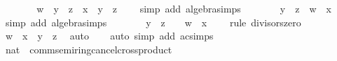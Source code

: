 \begin{isabellebody}
\ \ \ \ \isamarkupfalse%
\ \isamarkupfalse%
\ {\isachardoublequoteopen}w\ {\isacharasterisk}{\kern0pt}\ {\isacharparenleft}{\kern0pt}y\ {\isacharminus}{\kern0pt}\ z{\isacharparenright}{\kern0pt}\ {\isacharminus}{\kern0pt}\ x\ {\isacharasterisk}{\kern0pt}\ {\isacharparenleft}{\kern0pt}y\ {\isacharminus}{\kern0pt}\ z{\isacharparenright}{\kern0pt}\ {\isacharequal}{\kern0pt}\ {}{\isachardoublequoteclose}\ \isamarkupfalse%
\ {\isacharparenleft}{\kern0pt}simp\ add{\isacharcolon}{\kern0pt}\ algebra{\isacharunderscore}{\kern0pt}simps{\isacharparenright}{\kern0pt}\isanewline
\ \ \ \ \isamarkupfalse%
\ \isamarkupfalse%
\ {\isachardoublequoteopen}{\isacharparenleft}{\kern0pt}y\ {\isacharminus}{\kern0pt}\ z{\isacharparenright}{\kern0pt}\ {\isacharasterisk}{\kern0pt}\ {\isacharparenleft}{\kern0pt}w\ {\isacharminus}{\kern0pt}\ x{\isacharparenright}{\kern0pt}\ {\isacharequal}{\kern0pt}\ {}{\isachardoublequoteclose}\ \isamarkupfalse%
\ {\isacharparenleft}{\kern0pt}simp\ add{\isacharcolon}{\kern0pt}\ algebra{\isacharunderscore}{\kern0pt}simps{\isacharparenright}{\kern0pt}\isanewline
\ \ \ \ \isamarkupfalse%
\ \isamarkupfalse%
\ {\isachardoublequoteopen}y\ {\isacharminus}{\kern0pt}\ z\ {\isacharequal}{\kern0pt}\ {}\ {\isasymor}\ w\ {\isacharminus}{\kern0pt}\ x\ {\isacharequal}{\kern0pt}\ {}{\isachardoublequoteclose}\ \isamarkupfalse%
\ {\isacharparenleft}{\kern0pt}rule\ divisors{\isacharunderscore}{\kern0pt}zero{\isacharparenright}{\kern0pt}\isanewline
\ \ \ \ \isamarkupfalse%
\ \isamarkupfalse%
\ {\isachardoublequoteopen}w\ {\isacharequal}{\kern0pt}\ x\ {\isasymor}\ y\ {\isacharequal}{\kern0pt}\ z{\isachardoublequoteclose}\ \isamarkupfalse%
\ auto\isanewline
\ \ \isamarkupfalse%
\ {\isacharparenleft}{\kern0pt}auto\ simp\ add{\isacharcolon}{\kern0pt}\ ac{\isacharunderscore}{\kern0pt}simps{\isacharparenright}{\kern0pt}\isanewline
{}\isamarkupfalse%
%
\endisatagproof
{\isafoldproof}%
%
\isadelimproof
\isanewline
%
\endisadelimproof
\isanewline
{}\isamarkupfalse%
\ nat\ {\isacharcolon}{\kern0pt}{\isacharcolon}{\kern0pt}\ comm{\isacharunderscore}{\kern0pt}semiring{\isacharunderscore}{\kern0pt}{}{\isacharunderscore}{\kern0pt}cancel{\isacharunderscore}{\kern0pt}crossproduct\isanewline
%
\isadelimproof
%
\endisadelimproof
%
\isatagproof
{}\isamarkupfalse%
\isanewline

\end{isabellebody}
